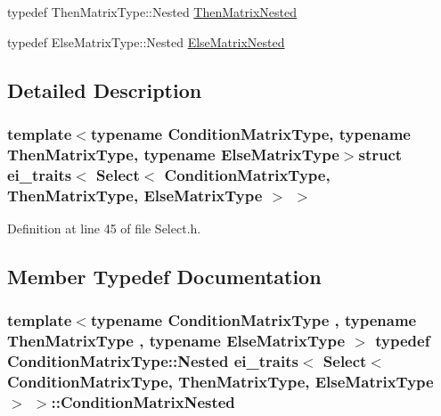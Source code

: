 \begin{DoxyCompactItemize}
\item 
typedef Then\-Matrix\-Type\-::\-Nested \hyperlink{structei__traits_3_01_select_3_01_condition_matrix_type_00_01_then_matrix_type_00_01_else_matrix_type_01_4_01_4_a3c3cae49aa15de90b2f6d778b58a9878}{Then\-Matrix\-Nested}
\item 
typedef Else\-Matrix\-Type\-::\-Nested \hyperlink{structei__traits_3_01_select_3_01_condition_matrix_type_00_01_then_matrix_type_00_01_else_matrix_type_01_4_01_4_a8f7b39218bee4b8e2b5654fee0ece385}{Else\-Matrix\-Nested}
\end{DoxyCompactItemize}


\subsection{Detailed Description}
\subsubsection*{template$<$typename Condition\-Matrix\-Type, typename Then\-Matrix\-Type, typename Else\-Matrix\-Type$>$struct ei\-\_\-traits$<$ Select$<$ Condition\-Matrix\-Type, Then\-Matrix\-Type, Else\-Matrix\-Type $>$ $>$}



Definition at line 45 of file Select.\-h.



\subsection{Member Typedef Documentation}
\hypertarget{structei__traits_3_01_select_3_01_condition_matrix_type_00_01_then_matrix_type_00_01_else_matrix_type_01_4_01_4_a6db58585d683bd9ed75f665f8d5418f4}{
\subsubsection[{Condition\-Matrix\-Nested}]{\setlength{\rightskip}{0pt plus 5cm}template$<$typename Condition\-Matrix\-Type , typename Then\-Matrix\-Type , typename Else\-Matrix\-Type $>$ typedef Condition\-Matrix\-Type\-::\-Nested {\bf ei\-\_\-traits}$<$ {\bf Select}$<$ Condition\-Matrix\-Type, Then\-Matrix\-Type, Else\-Matrix\-Type $>$ $>$\-::{\bf Condition\-Matrix\-Nested}}}\label{structei__traits_3_01_select_3_01_condition_matrix_type_00_01_then_matrix_type_00_01_else_matrix_type_01_4_01_4_a6db58585d683bd9ed75f665f8d5418f4}


